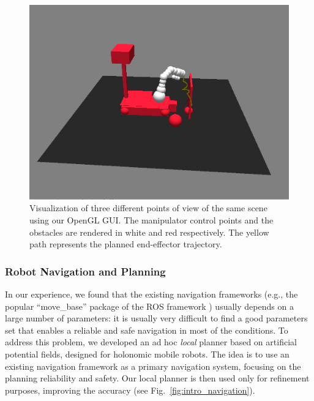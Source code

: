 \documentclass{llncs}
\begin{document}
\begin{figure}[h!]
\begin{center}
\begin{minipage}[b]{0.32\linewidth}
	\begin{center}\includegraphics[angle=0,width=\linewidth]{images/av9.png}\end{center}
\end{minipage}\hfill
\end{center}
\caption{Visualization of three different points of view of the same scene using our OpenGL GUI. The manipulator control points and the obstacles are rendered in white and red respectively. The yellow path represents the planned end-effector trajectory. }\label{fig:intro_manipulation}
\end{figure}


\subsubsection{Robot Navigation and Planning}\label{sec:navigation}


In our experience, we found that the existing navigation frameworks (e.g., the popular ``move\_base'' package of the ROS framework \cite{rosweb}) usually depends on a large number of parameters: it is usually very difficult to find a good parameters set that enables a reliable and safe navigation in most of the conditions. To address this problem, we developed an ad hoc \textit{local} planner based on artificial potential fields, designed for holonomic mobile robots. The idea is to use an existing navigation framework as a primary navigation system, focusing on the planning reliability and safety. Our local planner is then used only for refinement purposes, improving the accuracy (see Fig.~\ref{fig:intro_navigation}).
\end{document}
